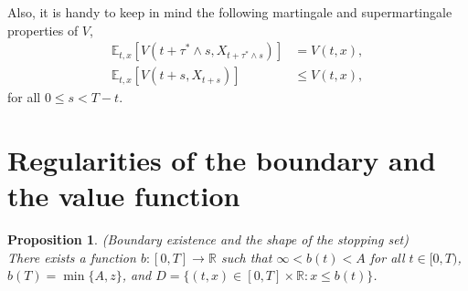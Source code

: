 \documentclass{tufte-handout}
\newcommand{\E}{\mathbb{E}} %
\newtheorem{pr}{Proposition}
\begin{document}
	Also, it is handy to keep in mind the following martingale and supermartingale properties of $V$,
	\begin{align}
	\E_{t, x}\left[V(t + \tau^*\wedge s, X_{t + \tau^*\wedge s})\right] &=  V(t, x), \label{eq:V_martingale} \\
	\E_{t, x}\left[V(t + s, X_{t + s})\right] &\leq V(t, x), \label{eq:V_supermartingale}
	\end{align}	
	for all $0 \leq s < T - t.$
	
	\section{Regularities of the boundary and the value function}
	
	\begin{pr}\label{pr:boundary_existence}(Boundary existence and the shape of the stopping set)\\
		There exists a function $b:[0, T]\rightarrow\mathbb{R}$ such that $\infty < b(t) < A$ for all $t\in[0, T)$, $b(T) = \min\{A, z\}$, and $D = \{(t, x)\in[0, T]\times\mathbb{R} : x \leq b(t)\}$.
	\end{pr}
	
\end{document}
